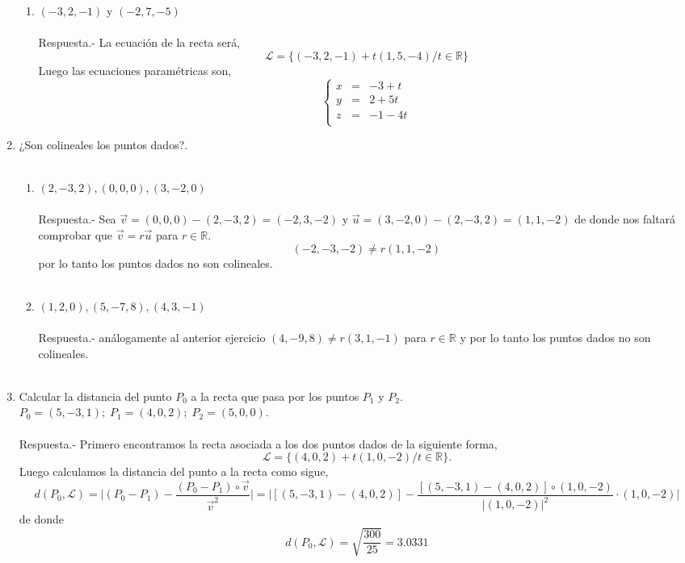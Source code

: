 \begin{enumerate}
\begin{enumerate}[\bfseries a)]
	    \item $(-3,2,-1)$ y $(-2,7,-5)$\\\\
		Respuesta.-\; La ecuación de la recta será,
		$$\mathcal{L} = \lbrace (-3,2,-1) + t(1,5,-4) / t\in \mathbb{R} \rbrace$$
		Luego las ecuaciones paramétricas son, 
		$$\left\{\begin{array}{rcr}
		    x&=&-3+t\\
		    y&=&2+5t\\
		    z&=&-1-4t\\
		\end{array}\right.$$
		\vspace{0.5cm}

	\end{enumerate}

    \item ¿Son colineales los puntos dados?.\\\\

	\begin{enumerate}[\bfseries a)]
	    
	    \item $(2,-3,2),(0,0,0),(3,-2,0)$\\\\
		Respuesta.-\; Sea $\vec{v}=(0,0,0)-(2,-3,2)=(-2,3,-2)$ y $\vec{u}=(3,-2,0)-(2,-3,2)=(1,1,-2)$ de donde nos faltará comprobar que $\vec{v}=r\vec{u}$ para $r\in \mathbb{R}$.
		$$(-2,-3,-2)\neq r(1,1,-2)$$
		por lo tanto los puntos dados no son colineales.\\\\

	    \item $(1,2,0),(5,-7,8),(4,3,-1)$\\\\
		Respuesta.-\; análogamente al anterior ejercicio $(4,-9,8)\neq r(3,1,-1)$ para $r\in \mathbb{R}$ y por lo tanto los puntos dados no son colineales.\\\\

	\end{enumerate}

    \item Calcular la distancia del punto $P_0$ a la recta que pasa por los puntos $P_1$ y $P_2$.\\ $P_0 = (5,-3,1); \; P_1=(4,0,2);\; P_2=(5,0,0)$.\\\\
	Respuesta.-\; Primero encontramos la recta asociada a los dos puntos dados de la siguiente forma, $$\mathcal{L} = \lbrace (4,0,2) + t(1,0,-2) / t \in \mathbb{R} \rbrace.$$
	Luego calculamos la distancia del punto a la recta como sigue, 
	$$d(P_0,\mathcal{L}) = \bigg| (P_0 - P_1) - \dfrac{(P_0-P_1)\circ \vec{v}}{\vec{v}^2}\bigg| = \bigg| [(5,-3,1)-(4,0,2)] - \dfrac{\left[(5,-3,1)-(4,0,2)\right]\circ (1,0,-2)}{|(1,0,-2)|^2} \cdot (1,0,-2)\bigg|$$
	    de donde $$d(P_0,\mathcal{L}) = \sqrt{\dfrac{300}{25}} = 3\mbox{.}0331$$\\


\end{enumerate}
